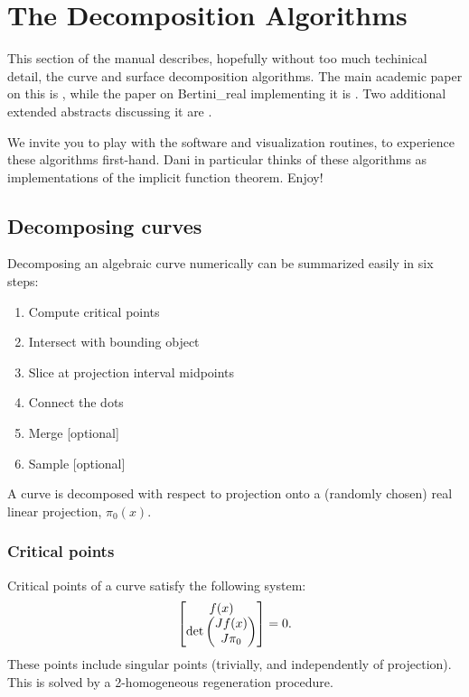 \section{The Decomposition Algorithms}
\label{sec:algo}

This section of the manual describes, hopefully without too much techinical detail, the curve and surface decomposition algorithms.  The main academic paper on this is \cite{besana2013cell}, while the paper on Bertini\_real implementing it is \cite{BrN15}.  Two additional extended abstracts discussing it are \cite{Brake2014, On14}.

We invite you to play with the software and visualization routines, to experience these algorithms first-hand.  Dani in particular thinks of these algorithms as implementations of the implicit function theorem.  Enjoy!


\subsection{Decomposing curves}
\label{sec:algo_curve}



Decomposing an algebraic curve numerically can be summarized easily in six steps:
%
\begin{enumerate}
\item Compute critical points
\item Intersect with bounding object
\item Slice at projection interval midpoints
\item Connect the dots
\item Merge [optional]
\item Sample [optional]
\end{enumerate}

A curve is decomposed with respect to projection onto a (randomly chosen) real linear projection, $\pi_0(x)$.



\subsubsection{Critical points}

Critical points of a curve satisfy the following system:
\begin{equation}
\begin{bmatrix}
f(x) \\
\textnormal{det} \begin{pmatrix} Jf(x) \\ J\pi_0 \end{pmatrix}
\end{bmatrix}  = 0. \label{eqn:curve_critpts}
\end{equation}
These points include singular points (trivially, and independently of projection).  This is solved by a 2-homogeneous regeneration procedure.


